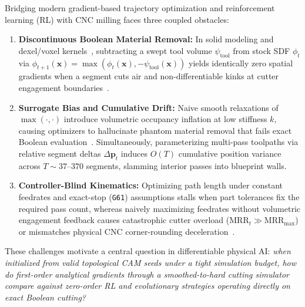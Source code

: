 \documentclass[conference]{IEEEtran}
\begin{document}
Bridging modern gradient-based trajectory optimization and reinforcement learning (RL) with CNC milling faces three coupled obstacles:
\begin{enumerate}
  \item \textbf{Discontinuous Boolean Material Removal:} In solid modeling and dexel/voxel kernels~\cite{vanhook1986dexel,coffland2021camotics}, subtracting a swept tool volume $\psi_{\text{tool}}$ from stock SDF $\phi_t$ via $\phi_{t+1}(\mathbf{x}) = \max(\phi_t(\mathbf{x}), -\psi_{\text{tool}}(\mathbf{x}))$ yields identically zero spatial gradients when a segment cuts air and non-differentiable kinks at cutter engagement boundaries~\cite{shapiro2007rfunctions}.
  \item \textbf{Surrogate Bias and Cumulative Drift:} Naive smooth relaxations of $\max(\cdot,\cdot)$ introduce volumetric occupancy inflation at low stiffness $k$, causing optimizers to hallucinate phantom material removal that fails exact Boolean evaluation~\cite{suh2022differentiable,metz2021gradients}. Simultaneously, parameterizing multi-pass toolpaths via relative segment deltas $\Delta \mathbf{p}_t$ induces $O(T)$ cumulative position variance across $T \sim 37\text{--}370$ segments, slamming interior passes into blueprint walls.
  \item \textbf{Controller-Blind Kinematics:} Optimizing path length under constant feedrates and exact-stop (\texttt{G61}) assumptions stalls when part tolerances fix the required pass count, whereas naively maximizing feedrates without volumetric engagement feedback causes catastrophic cutter overload ($\text{MRR}_t \gg \text{MRR}_{\max}$) or mismatches physical CNC corner-rounding deceleration~\cite{erkorkmaz2001highspeed,kramer2000rs274ngc}.
\end{enumerate}

These challenges motivate a central question in differentiable physical AI: \emph{when initialized from valid topological CAM seeds under a tight simulation budget, how do first-order analytical gradients through a smoothed-to-hard cutting simulator compare against zero-order RL and evolutionary strategies operating directly on exact Boolean cutting?}
\end{document}

